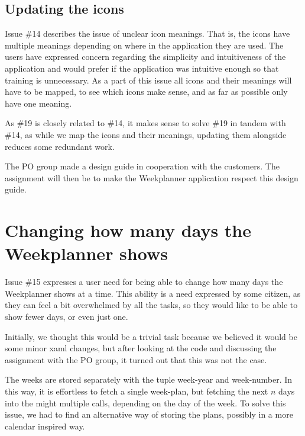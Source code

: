 \subsection{Updating the icons}

Issue \#14 describes the issue of unclear icon meanings. That is, the icons have multiple meanings depending on where in the application they are used. The users have expressed concern regarding the simplicity and intuitiveness of the application and would prefer if the application was intuitive enough so that training is unnecessary. As a part of this issue all icons and their meanings will have to be mapped, to see which icons make sense, and as far as possible only have one meaning. 

As \#19 is closely related to \#14, it makes sense to solve \#19 in tandem with \#14, as while we map the icons and their meanings, updating them alongside reduces some redundant work.

The \gls{PO} group made a design guide in cooperation with the customers. The assignment will then be to make the Weekplanner application respect this design guide.

\section{Changing how many days the Weekplanner shows} \label{sec:weekPlannerDaysToShow}

Issue \#15 expresses a user need for being able to change how many days the Weekplanner shows at a time. This ability is a need expressed by some citizen, as they can feel a bit overwhelmed by all the tasks, so they would like to be able to show fewer days, or even just one.

Initially, we thought this would be a trivial task because we believed it would be some minor \gls{xaml} changes, but after looking at the code and discussing the assignment with the \gls{PO} group, it turned out that this was not the case. 

The weeks are stored separately with the tuple week-year and week-number. In this way, it is effortless to fetch a single week-plan, but fetching the next $n$ days into the might multiple calls, depending on the day of the week. To solve this issue, we had to find an alternative way of storing the plans, possibly in a more calendar inspired way.
